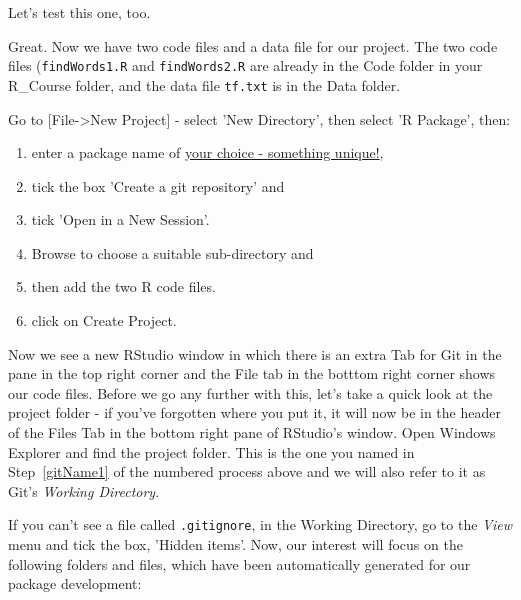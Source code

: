 \documentclass[titlepage]{book}\usepackage{knitr}
\begin{document}
Let's test this one, too.

\begin{knitrout}
\color{fgcolor}\begin{kframe}
\begin{alltt}
\hlstd{(}\hlstd{)}
\end{alltt}
\end{kframe}
\end{knitrout}
Great. Now we have two code files and a data file for our project. The two code files (\texttt{findWords1.R} and \texttt{findWords2.R}  are already in the Code folder in your R\_Course folder, and the data file \texttt{tf.txt} is in the Data folder.

Go to [File->New Project] - select 'New Directory', then select 'R Package', then:

\begin{enumerate}

\item{enter a package name of \underline{your choice - something unique!},}\label{gitName1}
\item{tick the box 'Create a git repository' and}
\item{tick 'Open in a New Session'.}
\item{Browse to choose a suitable sub-directory and}
\item{then add the two R code files.}
\item{click on Create Project.}

\end{enumerate}

Now we see a new RStudio window in which there is an extra Tab for Git in the pane in the top right corner and the File tab in the botttom right corner shows our code files. Before we go any further with this, let's take a quick look at the project folder - if you've forgotten where you put it, it will now be in the header of the Files Tab in the bottom right pane of RStudio's window.  Open Windows Explorer and find the project folder. This is the one you named in Step~\ref{gitName1} of the numbered process above and we will also refer to it as Git's \emph{Working Directory}.

If you can't see a file called \texttt{.gitignore}, in the Working Directory, go to the \emph{View} menu and tick the box, 'Hidden items'. Now, our interest will focus on the following folders and files, which have been automatically generated for our package development:
\end{document}
